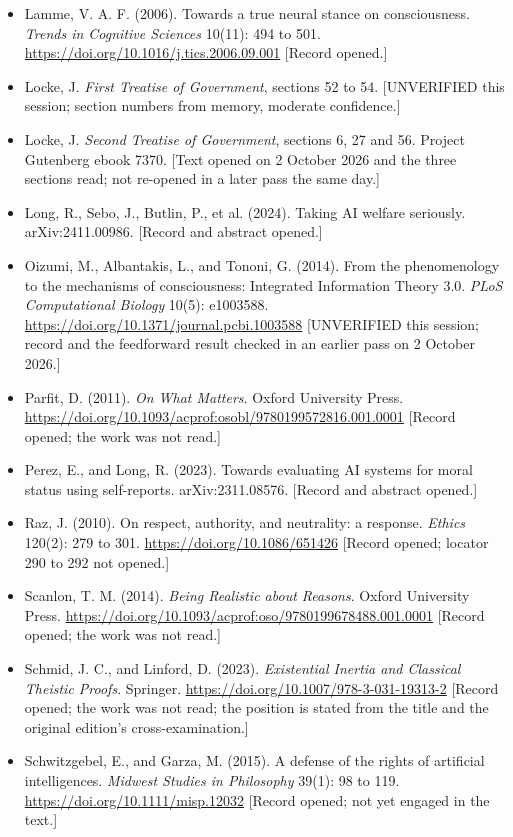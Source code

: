 \documentclass[11pt]{article}
\begin{document}
\begin{itemize}
\item Lamme, V. A. F. (2006). Towards a true neural stance on consciousness. \emph{Trends in Cognitive Sciences} 10(11): 494 to 501. \url{https://doi.org/10.1016/j.tics.2006.09.001} [Record opened.]
\item Locke, J. \emph{First Treatise of Government}, sections 52 to 54. [UNVERIFIED this session; section numbers from memory, moderate confidence.]
\item Locke, J. \emph{Second Treatise of Government}, sections 6, 27 and 56. Project Gutenberg ebook 7370. [Text opened on 2 October 2026 and the three sections read; not re-opened in a later pass the same day.]
\item Long, R., Sebo, J., Butlin, P., et al. (2024). Taking AI welfare seriously. arXiv:2411.00986. [Record and abstract opened.]
\item Oizumi, M., Albantakis, L., and Tononi, G. (2014). From the phenomenology to the mechanisms of consciousness: Integrated Information Theory 3.0. \emph{PLoS Computational Biology} 10(5): e1003588. \url{https://doi.org/10.1371/journal.pcbi.1003588} [UNVERIFIED this session; record and the feedforward result checked in an earlier pass on 2 October 2026.]
\item Parfit, D. (2011). \emph{On What Matters}. Oxford University Press. \url{https://doi.org/10.1093/acprof:osobl/9780199572816.001.0001} [Record opened; the work was not read.]
\item Perez, E., and Long, R. (2023). Towards evaluating AI systems for moral status using self-reports. arXiv:2311.08576. [Record and abstract opened.]
\item Raz, J. (2010). On respect, authority, and neutrality: a response. \emph{Ethics} 120(2): 279 to 301. \url{https://doi.org/10.1086/651426} [Record opened; locator 290 to 292 not opened.]
\item Scanlon, T. M. (2014). \emph{Being Realistic about Reasons}. Oxford University Press. \url{https://doi.org/10.1093/acprof:oso/9780199678488.001.0001} [Record opened; the work was not read.]
\item Schmid, J. C., and Linford, D. (2023). \emph{Existential Inertia and Classical Theistic Proofs}. Springer. \url{https://doi.org/10.1007/978-3-031-19313-2} [Record opened; the work was not read; the position is stated from the title and the original edition's cross-examination.]
\item Schwitzgebel, E., and Garza, M. (2015). A defense of the rights of artificial intelligences. \emph{Midwest Studies in Philosophy} 39(1): 98 to 119. \url{https://doi.org/10.1111/misp.12032} [Record opened; not yet engaged in the text.]

\end{itemize}
\end{document}
